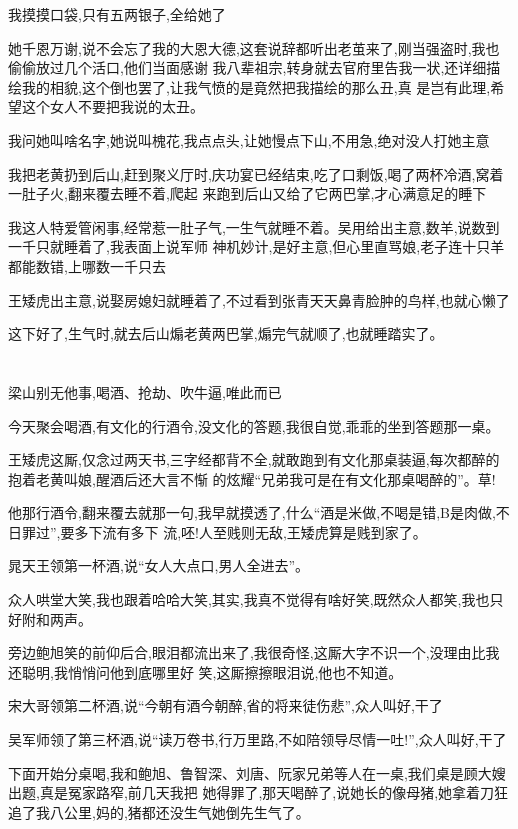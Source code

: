 ﻿\documentclass[12pt]{article}
\begin{document}
我摸摸口袋,只有五两银子,全给她了

她千恩万谢,说不会忘了我的大恩大德,这套说辞都听出老茧来了,刚当强盗时,我也偷偷放过几个活口,他们当面感谢
我八辈祖宗,转身就去官府里告我一状,还详细描绘我的相貌,这个倒也罢了,让我气愤的是竟然把我描绘的那么丑,真
是岂有此理,希望这个女人不要把我说的太丑。

我问她叫啥名字,她说叫槐花,我点点头,让她慢点下山,不用急,绝对没人打她主意

我把老黄扔到后山,赶到聚义厅时,庆功宴已经结束,吃了口剩饭,喝了两杯冷酒,窝着一肚子火,翻来覆去睡不着,爬起
来跑到后山又给了它两巴掌,才心满意足的睡下

我这人特爱管闲事,经常惹一肚子气,一生气就睡不着。吴用给出主意,数羊,说数到一千只就睡着了,我表面上说军师
神机妙计,是好主意,但心里直骂娘,老子连十只羊都能数错,上哪数一千只去

王矮虎出主意,说娶房媳妇就睡着了,不过看到张青天天鼻青脸肿的鸟样,也就心懒了

这下好了,生气时,就去后山煽老黄两巴掌,煽完气就顺了,也就睡踏实了。

\section{}

梁山别无他事,喝酒、抢劫、吹牛逼,唯此而已

今天聚会喝酒,有文化的行酒令,没文化的答题,我很自觉,乖乖的坐到答题那一桌。

王矮虎这厮,仅念过两天书,三字经都背不全,就敢跑到有文化那桌装逼,每次都醉的抱着老黄叫娘,醒酒后还大言不惭
的炫耀``兄弟我可是在有文化那桌喝醉的''。草!

他那行酒令,翻来覆去就那一句,我早就摸透了,什么``酒是米做,不喝是错,B是肉做,不日罪过'',要多下流有多下
流,呸!人至贱则无敌,王矮虎算是贱到家了。

晁天王领第一杯酒,说``女人大点口,男人全进去''。

众人哄堂大笑,我也跟着哈哈大笑,其实,我真不觉得有啥好笑,既然众人都笑,我也只好附和两声。

旁边鲍旭笑的前仰后合,眼泪都流出来了,我很奇怪,这厮大字不识一个,没理由比我还聪明,我悄悄问他到底哪里好
笑,这厮擦擦眼泪说,他也不知道。

宋大哥领第二杯酒,说``今朝有酒今朝醉,省的将来徒伤悲'',众人叫好,干了

吴军师领了第三杯酒,说``读万卷书,行万里路,不如陪领导尽情一吐!'',众人叫好,干了

下面开始分桌喝,我和鲍旭、鲁智深、刘唐、阮家兄弟等人在一桌,我们桌是顾大嫂出题,真是冤家路窄,前几天我把
她得罪了,那天喝醉了,说她长的像母猪,她拿着刀狂追了我八公里,妈的,猪都还没生气她倒先生气了。
\end{document}
